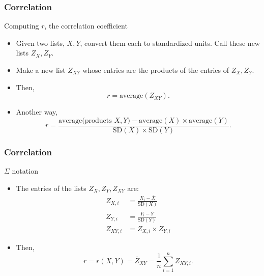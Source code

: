 \documentclass[handout]{beamer}
\begin{document}
   \begin{frame} \frametitle{Correlation}

   \begin{block}
   {Computing $r$, the correlation coefficient}

   \begin{itemize}
   \item Given two lists, $X, Y$, convert them
   each to standardized units. Call these new lists $Z_X, Z_Y$.

   \item Make a new list $Z_{XY}$ whose entries are the products
   of the entries of $Z_X, Z_Y$.
   \item Then,
   $$
   r = \text{average}(Z_{XY}).
   $$
   \item Another way,
   $$
   r = \frac{\text{average(products $X, Y$)} - \text{average}(X) \times \text{average}(Y)}{\text{SD}(X) \times \text{SD}(Y)}.
   $$
   \end{itemize}
   \end{block}
   \end{frame}


   \begin{frame} \frametitle{Correlation}

   \begin{block}
   {$\Sigma$ notation}

   \begin{itemize}
   \item The entries of the lists $Z_X, Z_Y, Z_{XY}$ are:
   $$
   \begin{aligned}
   Z_{X,i} &= \frac{X_i - \bar{X}}{\text{SD}(X)} \\
   Z_{Y,i} &= \frac{Y_i - \bar{Y}}{\text{SD}(Y)} \\
   Z_{XY,i} &= Z_{X,i} \times Z_{Y,i}
   \end{aligned}
   $$

   \item Then,
   $$
   r = r(X,Y) = \bar{Z}_{XY} = \frac{1}{n} \sum_{i=1}^n Z_{XY,i}.
   $$
   \end{itemize}

   \end{block}
   \end{frame}

\end{document}
